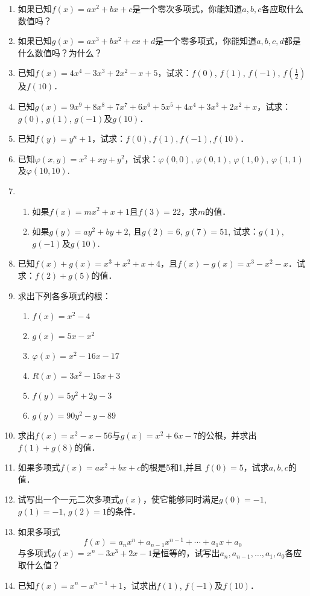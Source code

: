 \begin{enumerate}
\item 如果已知$f(x)=ax^2+bx+c$是一个零次多项式，你能知道$a,b,c$各应取什么数值吗？
\item 如果已知$g(x)=ax^3+bx^2+cx+d$是一个零多项式，你能知道$a,b,c,d$都是什么数值吗？为什么？
\item 已知$f(x)=4x^4-3x^3+2x^2-x+5$，试求：$f(0)$, $f(1)$, $f(-1)$, $f\left(\frac{1}{2}\right)$及$f(10)$．
\item 已知$g(x)=9x^9+8x^8+7x^7+6x^6+5x^5+4x^4+3x^3+2x^2+x$，试求：$g(0)$, $g(1)$, $g(-1)$及$g(10)$．

\item 已知$f(y)=y^n+1$，试求：$f(0),f(1),f(-1),f(10)$．

\item 已知$\varphi(x,y)=x^2+xy+y^2$，试求：$\varphi(0, 0)$, $\varphi(0, 1)$, $\varphi(1, 0)$, $\varphi(1, 1)$及$\varphi(10, 10)$.
\item \begin{enumerate}
    \item 如果$f(x)=mx^2+x+1$且$f(3)=22$，求$m$的值．
    \item 如果$g(y)=ay^2+by+2$, 且$g(2)=6$, $g (7)=51$, 试求：$g(1)$, $g(-1)$及$g(10)$.
\end{enumerate} 

\item 已知$f(x)+g(x)=x^3+x^2+x+4$，且$f(x)-g(x)=x^3-x^2-x$．试求：$f(2)+g(5)$的值．
\item 求出下列各多项式的根：
    \begin{multicols}{2}
\begin{enumerate}
    \item $f (x) =x^2-4$
    \item $g (x) =5x-x^2$
    \item $\varphi (x) =x^2-16x-17$
    \item $R(x)=3x^2-15x+3$
    \item $f(y)=5y^2+2y-3$
    \item $g(y)=90y^2-y-89$
\end{enumerate}
 \end{multicols}

\item 求出$f(x)=x^2-x-56$与$g(x)=x^2+6x-7$的公根，并求出$f(1)+g(8)$的值．
\item 如果多项式$f(x)=ax^2+bx+c$的根是5和1,并且
$f(0)=5$，试求$a,b,c$的值．
\item 试写出一个一元二次多项式$g(x)$，使它能够同时满足$g(0)=-1$, $g(1)=-1$, $g(2)=1$的条件．
\item 如果多项式
\[f (x) =a_nx^n+a_{n-1} x^{n-1}+\cdots+a_1x+a_0\]
与多项式$g(x)=x^n-3x^3+2x-1$是恒等的，试写出$a_n,a_{n-1},\ldots,a_1,a_0$各应取什么值？
\item 已知$f(x)=x^n-x^{n-1}+1$，试求出$f(1)$, $f(-1)$及$f (10)$．

\end{enumerate}


